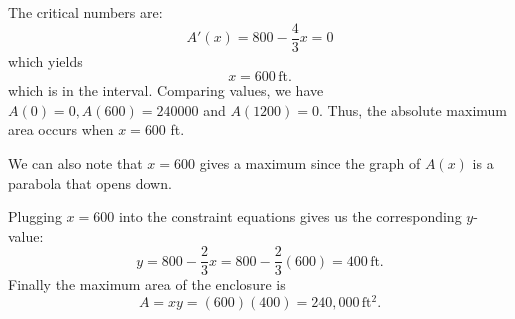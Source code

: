\documentclass[handout]{ximera}
\begin{document}
\begin{example}[example 1]
The critical numbers are:
\[A'(x) = 800 - \frac43 x = 0 \]
which yields
\[x= 600 \,\mbox{ft.}\]
which is in the interval. Comparing values, we have $A(0) = 0, A(600) = 240000$ and $A(1200) = 0$.
Thus, the absolute maximum area occurs when $x = 600$ ft. 

We can also note that $x = 600$ gives a maximum since the graph of $A(x)$ is a parabola that opens down.


\begin{image}
\end{image}


Plugging $x = 600$ into the constraint equations gives us the corresponding $y$-value:
\[y = 800 - \frac23 x = 800 - \frac23(600) = 400 \,\mbox{ft.}\]
Finally the maximum area of the enclosure is
\[A = xy = (600)(400) = 240{,}000 \,\mbox{ft$^2$}.\]
\end{example}


\begin{center}
\begin{foldable}
\end{foldable}
\end{center}
\end{document}
